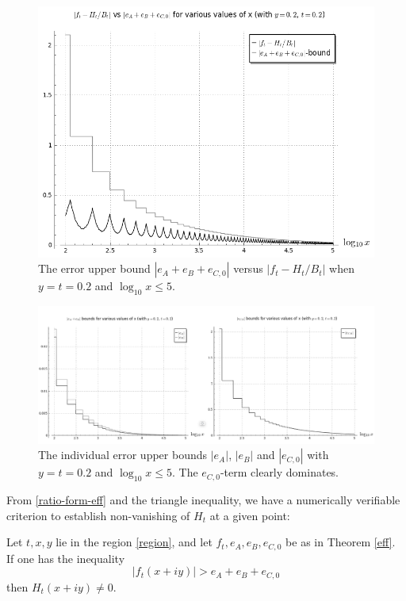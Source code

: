 \begin{figure}[h!]
  \includegraphics[width=0.8\linewidth]{ft_min_Ht_vs_errorterms.png}
  \caption{The error upper bound $|e_A+e_B+e_{C,0}|$ versus $|f_t - H_t/B_t|$ when $y=t=0.2$ and $\log_{10} x \leq 5$.}
\label{errorboundtot}
\end{figure}

\begin{figure}[h!]
  \includegraphics[width=1.0\linewidth]{eA_eB_eC_errorbounds.png}
  \caption{The individual error upper bounds $|e_A|$, $|e_B|$ and $|e_{C,0}|$ with $y=t=0.2$ and $\log_{10} x \leq 5$. The $e_{C,0}$-term clearly dominates.}
\label{ind_errorbounds}
\end{figure}

From \eqref{ratio-form-eff} and the triangle inequality, we have a numerically verifiable criterion to establish non-vanishing of $H_t$ at a given point:

\begin{corollary}\label{zero-test}  Let $t,x,y$ lie in the region \eqref{region}, and let $f_t, e_A, e_B, e_{C,0}$ be as in Theorem \ref{eff}.  If one has the inequality
\begin{equation}\label{criterion}
|f_t(x+iy)| > e_A + e_B + e_{C,0} 
\end{equation}
then $H_t(x+iy) \neq 0$.
\end{corollary}


